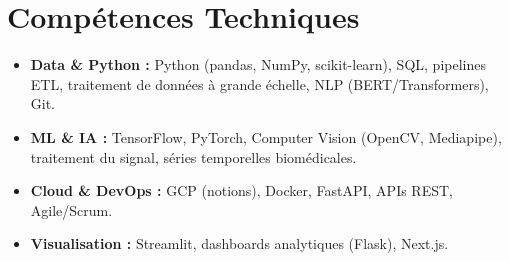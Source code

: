 \documentclass[a4paper,11pt]{article}
\begin{document}
\section{Compétences Techniques}
\begin{itemize}[leftmargin=*, nosep]
    \item \small{\textbf{Data \& Python :} Python (pandas, NumPy, scikit-learn), SQL, pipelines ETL, traitement de données à grande échelle, NLP (BERT/Transformers), Git.}
    \item \small{\textbf{ML \& IA :} TensorFlow, PyTorch, Computer Vision (OpenCV, Mediapipe), traitement du signal, séries temporelles biomédicales.}
    \item \small{\textbf{Cloud \& DevOps :} GCP (notions), Docker, FastAPI, APIs REST, Agile/Scrum.}
    \item \small{\textbf{Visualisation :} Streamlit, dashboards analytiques (Flask), Next.js.}
\end{itemize}

\end{document}
